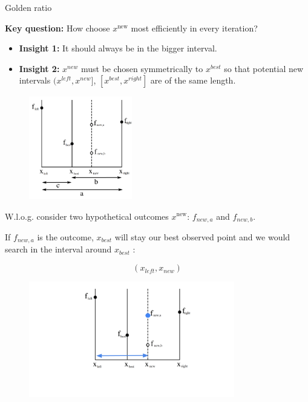 \documentclass[11pt,compress,t,notes=noshow, xcolor=table]{beamer}
\begin{document}
\begin{vbframe}{Golden ratio}

\textbf{Key question:} How choose $x^{\text{new}}$ most efficiently in every iteration? 

\begin{itemize}
    \item \textbf{Insight 1: } It should always be in the bigger interval.
    \item \textbf{Insight 2: } $x^{new}$ must be chosen symmetrically to $x^{best}$ so that potential new intervals $(x^{left}, x^{new}]$, $[x^{best}, x^{right}]$  are of the same length.
\end{itemize}

\lz 

\begin{figure}
\includegraphics[width=0.4\textwidth]{figure_man/goldensec.png}\\
\end{figure}

W.l.o.g. consider two hypothetical outcomes $x^{\text{new}}$: $f_{new, a}$ and $f_{new, b}$. 

\framebreak 

If $f_{new, a}$ is the outcome, $x_{best}$ will stay our best observed point and we would search in the interval around $x_{best}$ : 

$$
    (x_{left}, x_{new}) 
$$

\begin{figure}
\includegraphics[width=0.8\textwidth]{figure_man/goldensec-1.png}\\
\end{figure}


\end{vbframe}
\end{document}

